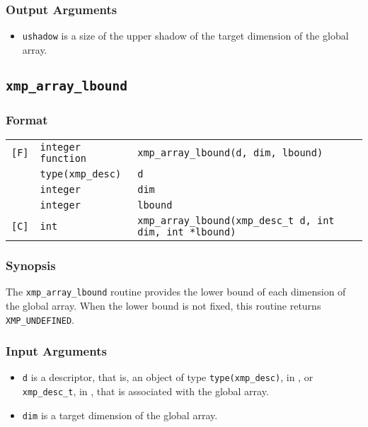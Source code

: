 \subsubsection*{Output Arguments}
\begin{itemize}
 \item {\tt ushadow} is a size of the upper shadow of the target dimension of the global array.
\end{itemize}


\subsection{\tt xmp\_array\_lbound}

\subsubsection*{Format}

\begin{tabular}{lll}

\verb![F]!& {\tt integer function}& {\tt xmp\_array\_lbound(d, dim, lbound)}\\
          & {\tt type(xmp\_desc)} & {\tt d}\\
          & {\tt integer} & {\tt dim}\\
          & {\tt integer} & {\tt lbound}\\

\verb![C]!&  {\tt int}& {\tt xmp\_array\_lbound(xmp\_desc\_t d, int dim, int *lbound)}\\

\end{tabular}

\subsubsection*{Synopsis}

The {\tt xmp\_array\_lbound} routine provides the lower bound of each dimension of the global array.
  When the lower bound is not fixed, this routine returns {\tt XMP\_UNDEFINED}.

\subsubsection*{Input Arguments}
\begin{itemize}
 \item {\tt d} is a descriptor, that is, an object of type 
       {\tt type(xmp\_desc)}, in {\XMPF}, or {\tt xmp\_desc\_t},
       in {\XMPC}, that is associated with the global array.
 \item {\tt dim} is a target dimension of the global array.
\end{itemize}

